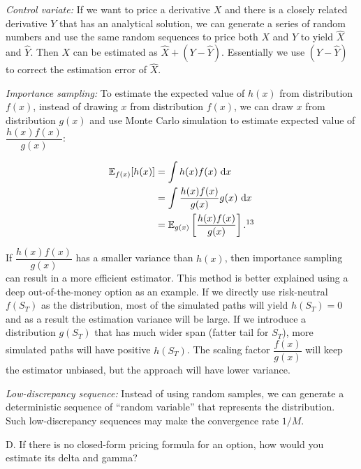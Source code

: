 \begin{solution}
\emph{Control variate:} If we want to price a derivative $X$ and there is a closely related
derivative $Y$ that has an analytical solution, we can generate a series of random numbers and use
the same random sequences to price both $X$ and $Y$ to yield $\hat{X}$ and $\hat{Y}$. Then $X$ can
be estimated as $\hat{X}+(Y-\hat{Y})$. Essentially we use $(Y-\hat{Y})$ to correct the estimation
error of $\hat{X}$.

\emph{Importance sampling:} To estimate the expected value of $h(x)$ from distribution $f(x)$,
instead of drawing $x$ from distribution $f(x)$, we can draw $x$ from distribution $g(x)$ and
use Monte Carlo simulation to estimate expected value of
$\dfrac{h(x)f(x)}{g(x)}$:

\[
\begin{aligned}
\E_{f(x)}[h(x)]&=\int h(x)f(x)\,\dd x\\
&=\int\frac{h(x)f(x)}{g(x)}g(x)\,\dd x\\
&=\E_{g(x)}\left[\frac{h(x)f(x)}{g(x)}\right].\footnotemark[13]
\end{aligned}
\]

If $\dfrac{h(x)f(x)}{g(x)}$ has a smaller variance than $h(x)$, then importance sampling can result
in a more efficient estimator. This method is better explained using a deep out-of-the-money
option as an example. If we directly use risk-neutral $f(S_T)$ as the distribution, most of the
simulated paths will yield $h(S_T)=0$ and as a result the estimation variance will be large. If we
introduce a distribution $g(S_T)$ that has much wider span (fatter tail for $S_T$), more simulated
paths will have positive $h(S_T)$. The scaling factor $\dfrac{f(x)}{g(x)}$ will keep the estimator
unbiased, but the approach will have lower variance.



\emph{Low-discrepancy sequence:} Instead of using random samples, we can generate a deterministic
sequence of ``random variable'' that represents the distribution. Such low-discrepancy sequences
may make the convergence rate $1/M$.

\end{solution}

\begin{problem}{D. If there is no closed-form pricing formula for an option, how would you estimate its
delta and gamma?}
\end{problem}

